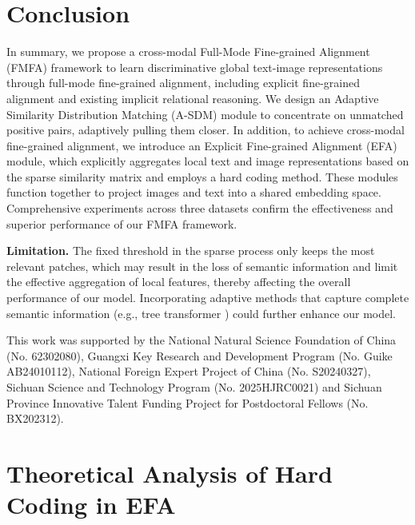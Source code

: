 \documentclass[acmsmall]{acmart}
\begin{document}
\section{Conclusion}

In summary, we propose a cross-modal Full-Mode Fine-grained
Alignment (FMFA) framework to learn discriminative global text-image
representations through full-mode fine-grained alignment, including
explicit fine-grained alignment and existing implicit relational
reasoning. We design an Adaptive Similarity Distribution Matching
(A-SDM) module to concentrate on unmatched positive pairs,
adaptively pulling them closer. In addition, to achieve cross-modal
fine-grained alignment, we introduce an Explicit Fine-grained
Alignment (EFA) module, which explicitly aggregates local text and
image representations based on the sparse similarity matrix and
employs a hard coding method. These modules function together to
project images and text into a shared embedding space. Comprehensive
experiments across three datasets confirm the effectiveness and
superior performance of our FMFA framework.

\textbf{Limitation.} The fixed threshold in the sparse process only
keeps the most relevant patches, which may result in the loss of
semantic information and limit the effective aggregation of local
features, thereby affecting the overall performance of our model.
Incorporating adaptive methods that capture complete semantic
information (e.g., tree transformer \cite{wang2019tree}) could
further enhance our model.

\begin{acks}
This work was supported by the National Natural Science Foundation
of China (No. 62302080), Guangxi Key Research and Development
Program (No. Guike AB24010112), National Foreign Expert Project of
China (No. S20240327), Sichuan Science and Technology Program (No.
2025HJRC0021) and Sichuan Province Innovative Talent Funding Project
for Postdoctoral Fellows (No. BX202312).
\end{acks}




\appendix

\section{Theoretical Analysis of Hard Coding in EFA}
\label{sec:theoretical}
\end{document}

